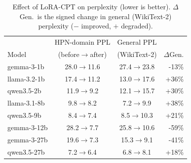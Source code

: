 \begin{table}[t]\centering\footnotesize
\caption{Effect of LoRA-CPT on perplexity (lower is better). $\Delta$Gen.\ is the signed change in general (WikiText-2) perplexity ($-$ improved, $+$ degraded).}
\label{tab:cptppl}
\begin{tabular}{@{}lccr@{}}
\toprule
& HPN-domain PPL & General PPL & \\
Model & (before$\to$after) & (WikiText-2) & $\Delta$Gen. \\ \midrule
gemma-3-1b & 28.0$\to$11.6 & 27.4$\to$23.8 & -13\% \\
llama-3.2-1b & 17.4$\to$11.2 & 13.0$\to$17.6 & +36\% \\
qwen3.5-2b & 11.9$\to$9.2 & 12.1$\to$15.7 & +30\% \\
llama-3.1-8b & 9.8$\to$8.2 & 7.2$\to$9.9 & +38\% \\
qwen3.5-9b & 8.4$\to$7.4 & 8.5$\to$10.3 & +21\% \\
gemma-3-12b & 28.2$\to$7.7 & 25.8$\to$10.6 & -59\% \\
gemma-3-27b & 19.6$\to$7.3 & 15.3$\to$9.1 & -41\% \\
qwen3.5-27b & 7.2$\to$6.4 & 6.8$\to$8.1 & +18\% \\
\bottomrule
\end{tabular}
\end{table}
